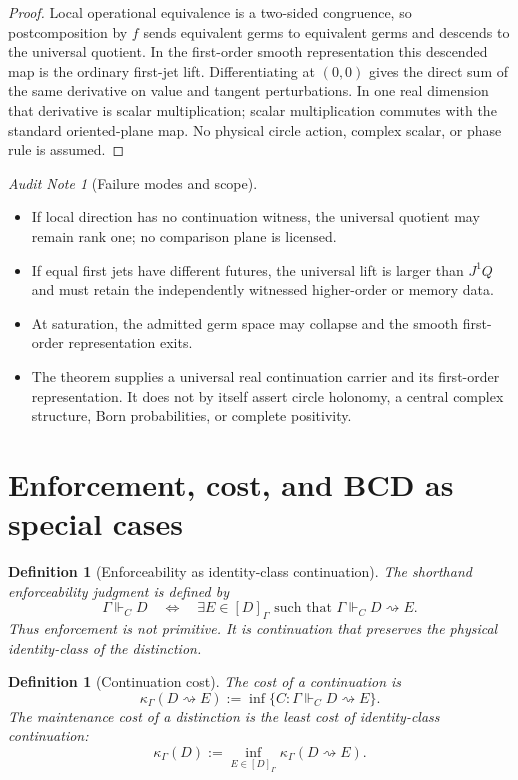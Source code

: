 \documentclass[11pt]{article}
\newtheorem{definition}[theorem]{Definition}
\theoremstyle{remark}
\newtheorem{audit}[theorem]{Audit Note}
\newcommand{\G}{\Gamma}
\newcommand{\entails}{\Vdash}
\newcommand{\goes}{\rightsquigarrow}
\newcommand{\Cost}{\kappa}
\begin{document}
\begin{proof}
Local operational equivalence is a two-sided congruence, so postcomposition by $f$ sends equivalent germs to equivalent germs and descends to the universal quotient.  In the first-order smooth representation this descended map is the ordinary first-jet lift.  Differentiating at $(0,0)$ gives the direct sum of the same derivative on value and tangent perturbations.  In one real dimension that derivative is scalar multiplication; scalar multiplication commutes with the standard oriented-plane map.  No physical circle action, complex scalar, or phase rule is assumed.
\end{proof}

\begin{audit}[Failure modes and scope]
\begin{itemize}
\item If local direction has no continuation witness, the universal quotient may remain rank one; no comparison plane is licensed.
\item If equal first jets have different futures, the universal lift is larger than $J^1Q$ and must retain the independently witnessed higher-order or memory data.
\item At saturation, the admitted germ space may collapse and the smooth first-order representation exits.
\item The theorem supplies a universal real continuation carrier and its first-order representation.  It does not by itself assert circle holonomy, a central complex structure, Born probabilities, or complete positivity.
\end{itemize}
\end{audit}


\section{Enforcement, cost, and BCD as special cases}

\begin{definition}[Enforceability as identity-class continuation]
The shorthand enforceability judgment is defined by
\[
        \G\entails_C D
        \quad\Longleftrightarrow\quad
        \exists E\in[D]_\G\text{ such that }\G\entails_C D\goes E.
\]
Thus enforcement is not primitive.  It is continuation that preserves the physical identity-class of the distinction.
\end{definition}

\begin{definition}[Continuation cost]
The cost of a continuation is
\[
        \Cost_\G(D\goes E)
        :=
        \inf\{C:\G\entails_C D\goes E\}.
\]
The maintenance cost of a distinction is the least cost of identity-class continuation:
\[
        \Cost_\G(D)
        :=
        \inf_{E\in[D]_\G}\Cost_\G(D\goes E).
\]
\end{definition}
\end{document}

